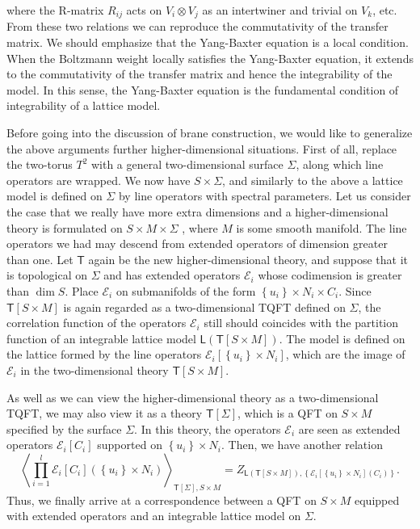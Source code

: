  where the R-matrix $R_{ij}$ acts on $V_{i}\otimes V_{j}$ as an
intertwiner and trivial on $V_{k}$, etc. From these two relations
we can reproduce the commutativity of the transfer matrix. We should
emphasize that the Yang-Baxter equation is a local condition. When
the Boltzmann weight locally satisfies the Yang-Baxter equation, it
extends to the commutativity of the transfer matrix and hence the
integrability of the model. In this sense, the Yang-Baxter equation
is the fundamental condition of integrability of a lattice model. 


Before going into the discussion of brane construction, we would like
to generalize the above arguments further higher-dimensional situations.
First of all, replace the two-torus $T^{2}$ with a general two-dimensional
surface $\Sigma$, along which line operators are wrapped. We now
have $S\times\Sigma$, and similarly to the above a lattice model
is defined on $\Sigma$ by line operators with spectral parameters.
Let us consider the case that we really have more extra dimensions
and a higher-dimensional theory is formulated on $S\times M\times\Sigma$
, where $M$ is some smooth manifold. The line operators we had may
descend from extended operators of dimension greater than one. Let
$\mathsf{T}$ again be the new higher-dimensional theory, and suppose
that it is topological on $\Sigma$ and has extended operators $\mathcal{E}_{i}$
whose codimension is greater than $\dim S$. Place $\mathcal{E}_{i}$
on submanifolds of the form $\left\{ u_{i}\right\} \times N_{i}\times C_{i}$.
Since $\mathsf{T}\left[S\times M\right]$ is again regarded as a two-dimensional
TQFT defined on $\Sigma$, the correlation function of the operators
$\mathcal{E}_{i}$ still should coincides with the partition function
of an integrable lattice model $\mathsf{L}\left(\mathsf{T}\left[S\times M\right]\right)$.
The model is defined on the lattice formed by the line operators $\mathcal{E}_{i}\left[\left\{ u_{i}\right\} \times N_{i}\right]$,
which are the image of $\mathcal{E}_{i}$ in the two-dimensional theory
$\mathsf{T}\left[S\times M\right]$. 

As well as we can view the higher-dimensional theory as a two-dimensional
TQFT, we may also view it as a theory $\mathsf{T}\left[\Sigma\right]$,
which is a QFT on $S\times M$ specified by the surface $\Sigma$.
In this theory, the operators $\mathcal{E}_{i}$ are seen as extended
operators $\mathcal{E}_{i}\left[C_{i}\right]$ supported on $\left\{ u_{i}\right\} \times N_{i}$.
Then, we have another relation
\begin{equation}
  \left\langle \prod_{i=1}^{l}\mathcal{E}_{i}\left[C_{i}\right]\left(\left\{ u_{i}\right\} \times N_{i}\right)\right\rangle_{\mathsf{T}\left[\Sigma\right],S\times M}  
    =Z_{\mathsf{L}\left(\mathsf{T}\left[S\times M\right]\right),\left\{ \mathcal{E}_{i}\left[\left\{ u_{i}\right\} \times N_{i}\right]\left(C_{i}\right)\right\} }.
\end{equation}
 Thus, we finally arrive at a correspondence between a QFT on $S\times M$
equipped with extended operators and an integrable lattice model on
$\Sigma$. 

